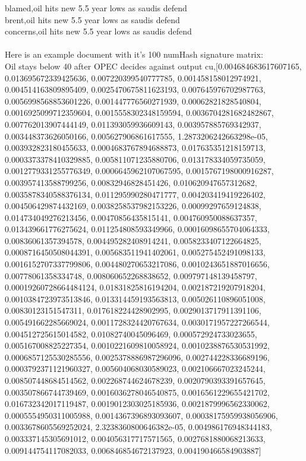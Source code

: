 blamed,oil hits new 5.5 year lows as saudis defend \\
brent,oil hits new 5.5 year lows as saudis defend \\
concerns,oil hits new 5.5 year lows as saudis defend\\ 
\\
Here is an example document with it's 100 numHash signature matrix:\\
Oil stays below 40 after OPEC decides against output cu,[0.004684683617607165, 0.013695672339425636, 0.007220399540777785, 0.001458158012974921, 0.004514163809895409, 0.0025470675811623193, 0.007645976702987763, 0.0056998568853601226, 0.001447776560271939, 0.00062821828540804, 0.0016925099712359604, 0.0015558302348159594, 0.0036704281682482867, 0.007762013907444149, 0.011393059936609143, 0.003957885769342937, 0.003448373626050166, 0.005627906861617555, 1.2873206242663298e-05, 0.003932823180455633, 0.0004683767894688873, 0.017635351218159713, 0.0003373378410329885, 0.005811071235880706, 0.013178334059735059, 0.0012779331255776349, 0.0006645962107067595, 0.0015767198000916287, 0.003957413588799256, 0.00832946828451426, 0.010620947657312682, 0.0035878340588376134, 0.011295990280471777, 0.004203419419226402, 0.004506429874432169, 0.0038258537982153226, 0.00099297659124838, 0.014734049276213456, 0.00470856435815141, 0.004760950088637357, 0.013439661776275624, 0.011254808593349966, 0.00016098655704064333, 0.00836061357394578, 0.004495282408914241, 0.0058233407122664825, 0.0008716450508044391, 0.005683511941402061, 0.005275452491098133, 0.0016152707337799806, 0.004480270653217086, 0.0010243651887016656, 0.00778061358334748, 0.008060652268838652, 0.009797148139458797, 0.00019260728664484124, 0.01831825816194204, 0.002187219207918204, 0.0010384723973513846, 0.013314459193563813, 0.005026110896051008, 0.00830123151547311, 0.017618224428902995, 0.0029013717911391106, 0.005491662285669024, 0.0011728324420767634, 0.0030171957227266544, 0.004512725615014582, 0.01082740045096469, 0.000572924733023655, 0.005167008825227354, 0.0010221609810058924, 0.0010238876530531992, 0.0006857125530285556, 0.0025378886987296096, 0.002744228336689196, 0.0003792371121960327, 0.005604068030589023, 0.002106667023245244, 0.008507448684514562, 0.002268744624678239, 0.0020790393391657645, 0.003507866744739469, 0.0016036278046540875, 0.0016561229655421702, 0.016732342017119487, 0.0019012303025185936, 0.0021879996562330062, 0.0005554950311005988, 0.0014367396893093607, 0.00038175959938056906, 0.0033678605569252024, 2.3238360800646382e-05, 0.004986176948344183, 0.003337145305691012, 0.004056317717571565, 0.0027681880068213633, 0.009144754117082033, 0.006846854672137923, 0.004190466584903887]


